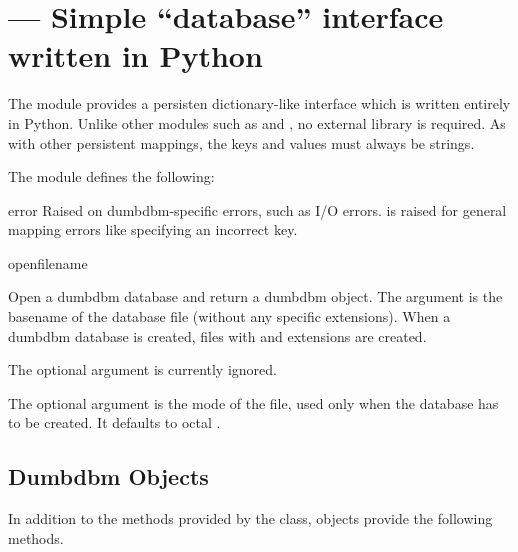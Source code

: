 \section{ ---
         Simple ``database'' interface written in Python}




The  module provides a persisten dictionary-like interface
which is written entirely in Python.  Unlike other modules such as
{} and , no external library is required.  As
with other persistent mappings, the keys and values must always be strings.

The module defines the following:

\begin{excdesc}{error}
Raised on dumbdbm-specific errors, such as I/O errors.  
is raised for general mapping errors like specifying an incorrect key.
\end{excdesc}

\begin{funcdesc}{open}{filename}

Open a dumbdbm database and return a dumbdbm object.  The 
argument is the basename of the database file (without any specific
extensions).  When a dumbdbm database is created, files with  and
 extensions are created.

The optional  argument is currently ignored.

The optional  argument is the \UNIX{} mode of the file, used
only when the database has to be created.  It defaults to octal
.
\end{funcdesc}

\subsection{Dumbdbm Objects \label{dumbdbm-objects}}

In addition to the methods provided by the  class,
 objects provide the following methods.

